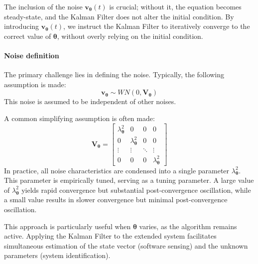 The inclusion of the noise $\mathbf{v}_{{\boldsymbol{\theta}}}(t)$ is crucial; without it, the equation becomes steady-state, and the Kalman Filter does not alter the initial condition.
By introducing $\mathbf{v}_{{\boldsymbol{\theta}}}(t)$, we instruct the Kalman Filter to iteratively converge to the correct value of ${\boldsymbol{\theta}}$, without overly relying on the initial condition.

\paragraph*{Noise definition}
The primary challenge lies in defining the noise. 
Typically, the following assumption is made:
\[\mathbf{v}_{\boldsymbol{\theta}}\sim WN(0,\mathbf{V}_{\boldsymbol{\theta}})\]
This noise is assumed to be independent of other noises.

A common simplifying assumption is often made:
\[\mathbf{V}_{{\boldsymbol{\theta}}}=\begin{bmatrix} \lambda_{\boldsymbol{\theta}}^2 & 0 & 0 & 0 \\ 0 & \lambda_{\boldsymbol{\theta}}^2 & 0 & 0 \\ \vdots &  \vdots & \ddots & \vdots \\ 0 & 0 & 0 & \lambda_{\boldsymbol{\theta}}^2 \end{bmatrix}\]
In practice, all noise characteristics are condensed into a single parameter $\lambda_{\boldsymbol{\theta}}^2$. 
This parameter is empirically tuned, serving as a tuning parameter.
A large value of  $\lambda_{\boldsymbol{\theta}}^2$ yields rapid convergence but substantial post-convergence oscillation, while a small value results in slower convergence but minimal post-convergence oscillation.

This approach is particularly useful when ${\boldsymbol{\theta}}$ varies, as the algorithm remains active. 
Applying the Kalman Filter to the extended system facilitates simultaneous estimation of the state vector (software sensing) and the unknown parameters (system identification).